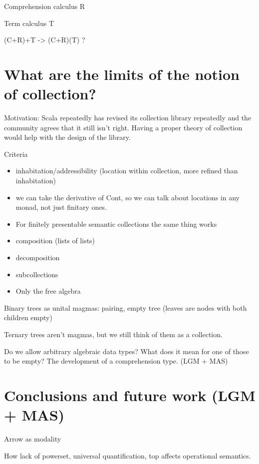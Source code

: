 \documentclass{article}
\renewcommand{\:}{\colon}
\begin{document}
Comprehension calculus R

Term calculus T

(C+R)+T -> (C+R)(T) ?

\section{What are the limits of the notion of collection?}
Motivation: Scala repeatedly has revised its collection library repeatedly and the community agrees that it still isn't right.  Having a proper theory of collection would help with the design of the library.

Criteria
\begin{itemize}
  \item inhabitation/addressibility (location within collection, more refined than inhabitation) 
  \item we can take the derivative of Cont, so we can talk about locations in any monad, not just finitary ones.
  \item For finitely presentable semantic collections the same thing works
  \item composition (lists of lists)
  \item decomposition
  \item subcollections
  \item Only the free algebra
\end{itemize}

Binary trees as unital magmas: pairing, empty tree (leaves are nodes with both children empty)

Ternary trees aren't magmas, but we still think of them as a collection.

Do we allow arbitrary algebraic data types?  What does it mean for one of those to be empty?
The development of a comprehension type. (LGM + MAS)

\section{Conclusions and future work (LGM + MAS)}
Arrow as modality

How lack of powerset, universal quantification, top affects operational semantics.

%
%
\end{document}
